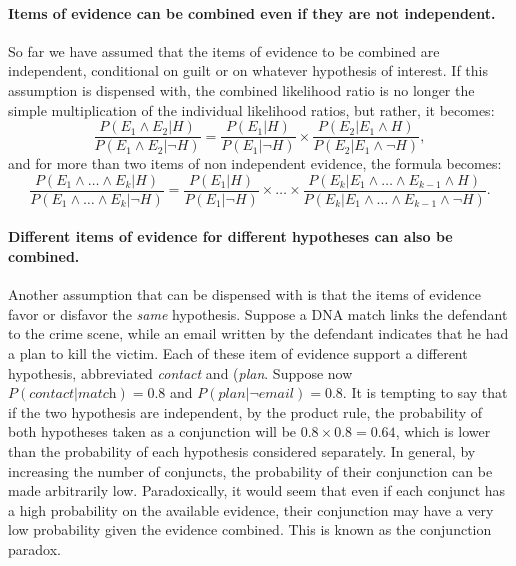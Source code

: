 \documentclass[10pt]{article}
\begin{document}
\paragraph{Items of evidence can be combined even if they are not independent.}

So far we have assumed that the items of evidence to be combined are independent, 
conditional on guilt or on whatever hypothesis of interest. 
%
%
If this assumption is dispensed with, the combined likelihood ratio is no longer the simple 
multiplication of the individual likelihood ratios, 
but rather, it becomes:
%
\[\frac{P(E_1\wedge E_2 | H)}{P(E_1\wedge E_2 | \neg H)}=\frac{P(E_1| H)}{P(E_1| \neg H)}\times \frac{P(E_2 | E_1\wedge H)}{P(E_2| E_1\wedge \neg H)},\]
%
and for more than two items of non independent evidence, the formula becomes:
%
\[\frac{P(E_1\wedge \dots \wedge E_k | H)}{P(E_1\wedge \dots \wedge E_k | \neg H)}=\frac{P(E_1| H)}{P(E_1| \neg H)} \times \dots \times \frac{P(E_k | E_1  \wedge \dots \wedge E_{k-1} \wedge H)}{P(E_k| E_1 \wedge \dots \wedge E_{k-1} \wedge \neg H)} .\]




\paragraph{Different items of evidence for different hypotheses can also be combined.}

Another assumption that can be dispensed with is that the items of evidence favor or disfavor the \textit{same} hypothesis. %
Suppose a DNA match links the defendant to the crime scene, while an email written by the defendant indicates 
that he had a plan to kill the victim. Each of these item of evidence support a different hypothesis, abbreviated
 \textit{contact} and (\textit{plan}.
Suppose now $P( \textit{contact} | \textit{match})= 0.8$ and $P(\textit{plan} | \neg \textit{email})=0.8$. It is tempting 
to say that if the two hypothesis are independent, by the product rule, the probability of both hypotheses taken 
as a conjunction will be $0.8\times 0.8=0.64$, which is lower than the probability 
of each hypothesis considered separately.
%
%
In general, by increasing the number of conjuncts, 
the probability of their conjunction can be made arbitrarily low. 
Paradoxically, it would seem that even if each conjunct has 
a high probability on the available evidence, their conjunction may have 
a very low probability given the evidence combined. 
This is known as the conjunction paradox. %
\end{document}
